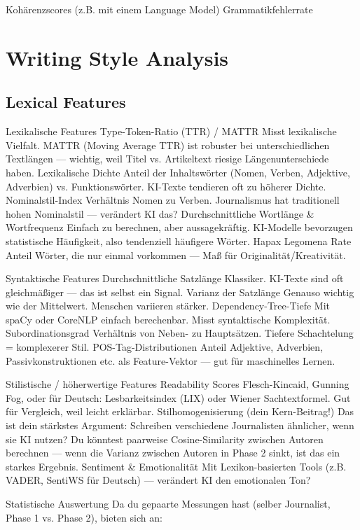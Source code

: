 Kohärenzscores (z.B. mit einem Language Model)
Grammatikfehlerrate
\section{Writing Style Analysis}

\subsection{Lexical Features}
Lexikalische Features
Type-Token-Ratio (TTR) / MATTR
Misst lexikalische Vielfalt. MATTR (Moving Average TTR) ist robuster bei unterschiedlichen Textlängen — wichtig, weil Titel vs. Artikeltext riesige Längenunterschiede haben.
Lexikalische Dichte
Anteil der Inhaltswörter (Nomen, Verben, Adjektive, Adverbien) vs. Funktionswörter. KI-Texte tendieren oft zu höherer Dichte.
Nominalstil-Index
Verhältnis Nomen zu Verben. Journalismus hat traditionell hohen Nominalstil — verändert KI das?
Durchschnittliche Wortlänge & Wortfrequenz
Einfach zu berechnen, aber aussagekräftig. KI-Modelle bevorzugen statistische Häufigkeit, also tendenziell häufigere Wörter.
Hapax Legomena Rate
Anteil Wörter, die nur einmal vorkommen — Maß für Originalität/Kreativität.

Syntaktische Features
Durchschnittliche Satzlänge
Klassiker. KI-Texte sind oft gleichmäßiger — das ist selbst ein Signal.
Varianz der Satzlänge
Genauso wichtig wie der Mittelwert. Menschen variieren stärker.
Dependency-Tree-Tiefe
Mit spaCy oder CoreNLP einfach berechenbar. Misst syntaktische Komplexität.
Subordinationsgrad
Verhältnis von Neben- zu Hauptsätzen. Tiefere Schachtelung = komplexerer Stil.
POS-Tag-Distributionen
Anteil Adjektive, Adverbien, Passivkonstruktionen etc. als Feature-Vektor — gut für maschinelles Lernen.

Stilistische / höherwertige Features
Readability Scores
Flesch-Kincaid, Gunning Fog, oder für Deutsch: Lesbarkeitsindex (LIX) oder Wiener Sachtextformel. Gut für Vergleich, weil leicht erklärbar.
Stilhomogenisierung (dein Kern-Beitrag!)
Das ist dein stärkstes Argument: Schreiben verschiedene Journalisten ähnlicher, wenn sie KI nutzen? Du könntest paarweise Cosine-Similarity zwischen Autoren berechnen — wenn die Varianz zwischen Autoren in Phase 2 sinkt, ist das ein starkes Ergebnis.
Sentiment & Emotionalität
Mit Lexikon-basierten Tools (z.B. VADER, SentiWS für Deutsch) — verändert KI den emotionalen Ton?

Statistische Auswertung
Da du gepaarte Messungen hast (selber Journalist, Phase 1 vs. Phase 2), bieten sich an:

